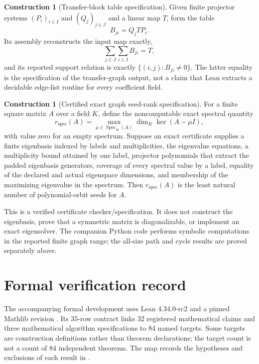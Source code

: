 \documentclass[11pt]{article}
\theoremstyle{definition}
\newtheorem{construction}[theorem]{Construction}
\theoremstyle{remark}
\newcommand{\Spec}{\operatorname{Spec}}
\begin{document}
\begin{construction}[Transfer-block table specification]
\label{con:transfer-block-algorithm}
Given finite projector systems $(P_i)_{i\in I}$ and $(Q_j)_{j\in J}$ and a
linear map $T$, form the table
\[
B_{ji}=Q_jTP_i.
\]
Its assembly reconstructs the input map exactly,
\[
\sum_{j\in J}\sum_{i\in I}B_{ji}=T,
\]
and its reported support relation is exactly
$\{(i,j):B_{ji}\ne0\}$.  The latter equality is the specification of the
transfer-graph output, not a claim that Lean extracts a decidable edge-list
routine for every coefficient field.
\end{construction}

\begin{construction}[Certified exact graph seed-rank specification]
\label{con:exact-graph-seed-rank}
For a finite square matrix $A$ over a field $K$, define the noncomputable exact
spectral quantity
\[
r_{\mathrm{spec}}(A)
=
\max_{\mu\in\Spec_K(A)}
\dim_K\ker(A-\mu I),
\]
with value zero for an empty spectrum.  Suppose an exact certificate supplies
a finite eigenbasis indexed by labels and multiplicities, the eigenvalue
equations, a multiplicity bound attained by one label, projector polynomials
that extract the padded eigenbasis generators, coverage of every spectral
value by a label, equality of the declared and actual eigenspace dimensions,
and membership of the maximizing eigenvalue in the spectrum.  Then
$r_{\mathrm{spec}}(A)$ is the least natural number of polynomial-orbit seeds
for $A$.

This is a verified certificate checker/specification.  It does not construct
the eigenbasis, prove that a symmetric matrix is diagonalizable, or implement
an exact eigensolver.  The companion Python code performs symbolic
computations in the reported finite graph range; the all-size path and cycle
results are proved separately above.
\end{construction}

\section{Formal verification record}

The accompanying formal development uses Lean 4.34.0-rc2 \cite{demouraUllrich2021}
and a pinned Mathlib revision \cite{mathlib2020}. Its 35-row contract links 32 registered mathematical
claims and three mathematical algorithm specifications to 84 named targets.
Some targets are construction definitions rather than theorem declarations;
the target count is not a count of 84 independent theorems. The map records
the hypotheses and exclusions of each result in
.
\end{document}
